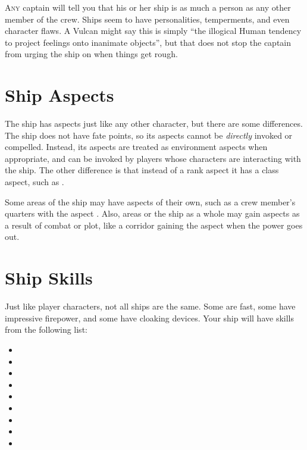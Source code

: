 \documentclass[12pt,titlepage,openany]{book}
\begin{document}
\lettrine[lines=1]{A}{ny} captain will tell you that his or her ship is as much
a person as any other member of the crew. Ships seem to have personalities,
temperments, and even character flaws. A Vulcan might say this is simply ``the
illogical Human tendency to project feelings onto inanimate objects'', but that
does not stop the captain from urging the ship on when things get rough.

\section{Ship Aspects}\label{sec:ship-aspects}

The ship has aspects just like any other character, but there are some
differences. The ship does not have fate points, so its aspects cannot be
\emph{directly} invoked or compelled. Instead, its aspects are treated as
environment aspects when appropriate, and can be invoked by players whose
characters are interacting with the ship. The other difference is that instead
of a rank aspect it has a class aspect, such as .

Some areas of the ship may have aspects of their own, such as a crew member's
quarters with the aspect . Also, areas or the ship
as a whole may gain aspects as a result of combat or plot, like a corridor
gaining the aspect  when the power goes out.

\section{Ship Skills}\label{sec:ship-skills}

Just like player characters, not all ships are the same. Some are fast, some
have impressive firepower, and some have cloaking devices. Your ship will have
skills from the following list:

\begin{multicols}{3}
    \raggedcolumns
    \begin{itemize}
        \item {}
        \item {}
        \item {}
        \item {}
        \item {}
        \item {}
        \item {}
        \item {}
        \item {}
    \end{itemize}
\end{multicols}
\end{document}
